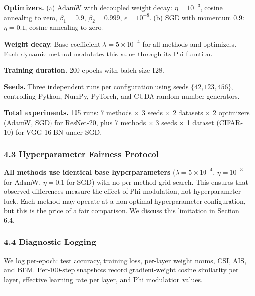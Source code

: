 \documentclass[
]{article}
\begin{document}
\textbf{Optimizers.} (a) AdamW with decoupled weight decay:
\(\eta = 10^{-3}\), cosine annealing to zero, \(\beta_1 = 0.9\),
\(\beta_2 = 0.999\), \(\epsilon = 10^{-8}\). (b) SGD with momentum 0.9:
\(\eta = 0.1\), cosine annealing to zero.

\textbf{Weight decay.} Base coefficient \(\lambda = 5 \times 10^{-4}\)
for all methods and optimizers. Each dynamic method modulates this value
through its Phi function.

\textbf{Training duration.} 200 epochs with batch size 128.

\textbf{Seeds.} Three independent runs per configuration using seeds
\(\{42, 123, 456\}\), controlling Python, NumPy, PyTorch, and CUDA
random number generators.

\textbf{Total experiments.} 105 runs: 7 methods \(\times\) 3 seeds
\(\times\) 2 datasets \(\times\) 2 optimizers (AdamW, SGD) for
ResNet-20, plus 7 methods \(\times\) 3 seeds \(\times\) 1 dataset
(CIFAR-10) for VGG-16-BN under SGD.

\hypertarget{hyperparameter-fairness-protocol}{%
\subsubsection{4.3 Hyperparameter Fairness
Protocol}\label{hyperparameter-fairness-protocol}}

\textbf{All methods use identical base hyperparameters}
(\(\lambda = 5 \times 10^{-4}\), \(\eta = 10^{-3}\) for AdamW,
\(\eta = 0.1\) for SGD) with no per-method grid search. This ensures
that observed differences measure the effect of Phi modulation, not
hyperparameter luck. Each method may operate at a non-optimal
hyperparameter configuration, but this is the price of a fair
comparison. We discuss this limitation in Section 6.4.

\hypertarget{diagnostic-logging}{%
\subsubsection{4.4 Diagnostic Logging}\label{diagnostic-logging}}

We log per-epoch: test accuracy, training loss, per-layer weight norms,
CSI, AIS, and BEM. Per-100-step snapshots record gradient-weight cosine
similarity per layer, effective learning rate per layer, and Phi
modulation values.

\begin{center}\rule{0.5\linewidth}{0.5pt}\end{center}
\end{document}
